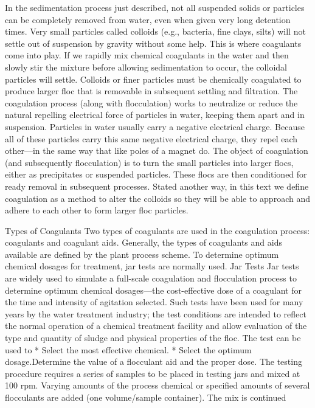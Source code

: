 \documentclass{article}
\begin{document}
In the sedimentation process just described, not all suspended solids or
particles can be completely removed from water, even when given very
long detention times. Very small particles called colloids (e.g.,
bacteria, fine clays, silts) will not settle out of suspension by
gravity without some help. This is where coagulants come into play. If
we rapidly mix chemical coagulants in the water and then slowly stir the
mixture before allowing sedimentation to occur, the colloidal particles
will settle. Colloids or finer particles must be chemically coagulated
to produce larger floc that is removable in subsequent settling and
filtration. The coagulation process (along with flocculation) works to
neutralize or reduce the natural repelling electrical force of particles
in water, keeping them apart and in suspension. Particles in water
usually carry a negative electrical charge. Because all of these
particles carry this same negative electrical charge, they repel each
other---in the same way that like poles of a magnet do. The object of
coagulation (and subsequently flocculation) is to turn the small
particles into larger flocs, either as precipitates or suspended
particles. These flocs are then conditioned for ready removal in
subsequent processes. Stated another way, in this text we define
coagulation as a method to alter the colloids so they will be able to
approach and adhere to each other to form larger floc particles.

Types of Coagulants Two types of coagulants are used in the coagulation
process: coagulants and coagulant aids. Generally, the types of
coagulants and aids available are defined by the plant process scheme.
To determine optimum chemical dosages for treatment, jar tests are
normally used. Jar Tests Jar tests are widely used to simulate a
full-scale coagulation and flocculation process to determine optimum
chemical dosages---the cost-effective dose of a coagulant for the time
and intensity of agitation selected. Such tests have been used for many
years by the water treatment industry; the test conditions are intended
to reflect the normal operation of a chemical treatment facility and
allow evaluation of the type and quantity of sludge and physical
properties of the floc. The test can be used to * Select the most
effective chemical. * Select the optimum dosage.Determine the value of a
flocculant aid and the proper dose. The testing procedure requires a
series of samples to be placed in testing jars and mixed at 100 rpm.
Varying amounts of the process chemical or specified amounts of several
flocculants are added (one volume/sample container). The mix is
continued
\end{document}
